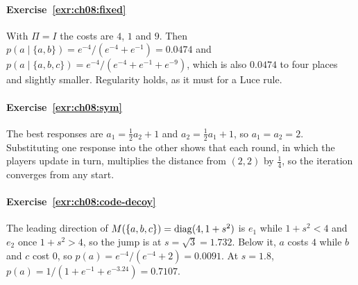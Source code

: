 \paragraph{Exercise~\ref{exr:ch08:fixed}}
With $\Pi=I$ the costs are $4$, $1$ and $9$. Then $p(a\mid\{a,b\})=e^{-4}/(e^{-4}+e^{-1})=0.0474$ and $p(a\mid\{a,b,c\})=e^{-4}/(e^{-4}+e^{-1}+e^{-9})$, which is also $0.0474$ to four places and slightly smaller. Regularity holds, as it must for a Luce rule.

\paragraph{Exercise~\ref{exr:ch08:sym}}
The best responses are $a_1=\tfrac12a_2+1$ and $a_2=\tfrac12a_1+1$, so $a_1=a_2=2$. Substituting one response into the other shows that each round, in which the players update in turn, multiplies the distance from $(2,2)$ by $\tfrac14$, so the iteration converges from any start.

\paragraph{Exercise~\ref{exr:ch08:code-decoy}}
The leading direction of $M(\{a,b,c\})=\operatorname{diag}(4,1+s^2)$ is $e_1$ while $1+s^2<4$ and $e_2$ once $1+s^2>4$, so the jump is at $s=\sqrt3=1.732$. Below it, $a$ costs $4$ while $b$ and $c$ cost $0$, so $p(a)=e^{-4}/(e^{-4}+2)=0.0091$. At $s=1.8$, $p(a)=1/(1+e^{-1}+e^{-3.24})=0.7107$.
